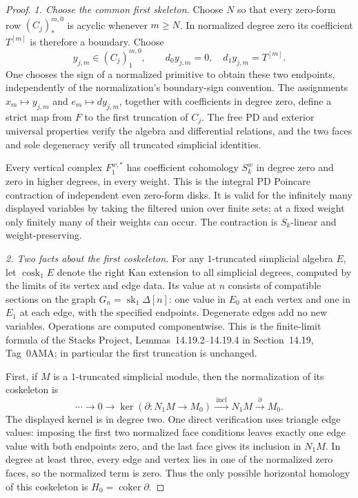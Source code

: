 \begin{proof}
\emph{1. Choose the common first skeleton.}
Choose $N$ so that every zero-form row $(C_j)_*^{m,0}$ is
acyclic whenever $m\ge N$. In normalized degree zero its
coefficient $T^{[m]}$ is therefore a boundary. Choose
\[
 y_{j,m}\in (C_j)_1^{m,0},\qquad
       d_0y_{j,m}=0,\quad d_1y_{j,m}=T^{[m]}.
                                                               \tag{136.SK2}
\]
One chooses the sign of a normalized primitive to obtain
these two endpoints, independently of the normalization's
boundary-sign convention. The assignments
$x_m\mapsto y_{j,m}$ and $e_m\mapsto dy_{j,m}$, together with
coefficients in degree zero, define a strict map from $F$
to the first truncation of $C_j$. The free PD and exterior
universal properties verify the algebra and differential
relations, and the two faces and sole degeneracy verify
all truncated simplicial identities.

Every vertical complex $F_1^{w,*}$ has coefficient cohomology
$S_k^w$ in degree zero and zero in higher degrees, in every
weight. This is the integral PD Poincare contraction of
independent even zero-form disks. It is valid for the
infinitely many displayed variables by taking the filtered
union over finite sets; at a fixed weight only finitely many
of their weights can occur. The contraction is $S_k$-linear
and weight-preserving.

\emph{2. Two facts about the first coskeleton.}
For any $1$-truncated simplicial algebra $E$, let
$\operatorname{cosk}_1E$ denote the right Kan extension to
all simplicial degrees, computed by the limits of its
vertex and edge data. Its value at $n$ consists of compatible
sections on the graph $G_n=\operatorname{sk}_1\Delta[n]$:
one value in $E_0$ at each vertex and one in $E_1$ at each
edge, with the specified endpoints. Degenerate edges add
no new variables. Operations are computed componentwise.
This is the finite-limit formula of the Stacks Project,
Lemmas~14.19.2--14.19.4 in Section~14.19, Tag~0AMA;
in particular the first truncation is unchanged.

First, if $M$ is a $1$-truncated simplicial module, then the
normalization of its coskeleton is
\[
 \cdots\longrightarrow0\longrightarrow
       \ker(\partial:N_1M\to M_0)
       \xrightarrow{\;\mathrm{incl}\;}N_1M
       \xrightarrow{\partial}M_0.
                                                               \tag{136.SK3}
\]
The displayed kernel is in degree two. One direct verification
uses triangle edge values: imposing the first two normalized
face conditions leaves exactly one edge value with both
endpoints zero, and the last face gives its inclusion in
$N_1M$. In degree at least three, every edge and vertex lies
in one of the normalized zero faces, so the normalized term
is zero. Thus the only possible horizontal homology of this
coskeleton is $H_0=\operatorname{coker}\partial$.


\end{proof}
